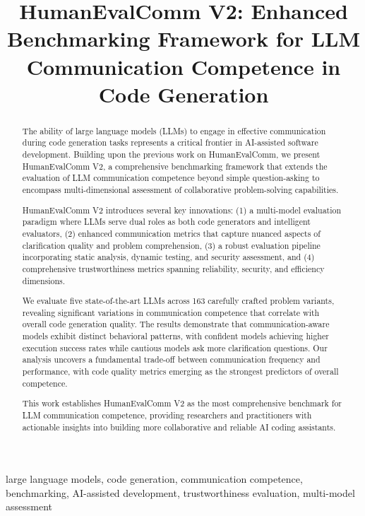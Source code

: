 \documentclass[conference]{IEEEtran}
\title{HumanEvalComm V2: Enhanced Benchmarking Framework for LLM Communication Competence in Code Generation}
\begin{document}
\maketitle

\begin{abstract}
The ability of large language models (LLMs) to engage in effective communication during code generation tasks represents a critical frontier in AI-assisted software development. Building upon the previous work on HumanEvalComm, we present HumanEvalComm V2, a comprehensive benchmarking framework that extends the evaluation of LLM communication competence beyond simple question-asking to encompass multi-dimensional assessment of collaborative problem-solving capabilities.

HumanEvalComm V2 introduces several key innovations: (1) a multi-model evaluation paradigm where LLMs serve dual roles as both code generators and intelligent evaluators, (2) enhanced communication metrics that capture nuanced aspects of clarification quality and problem comprehension, (3) a robust evaluation pipeline incorporating static analysis, dynamic testing, and security assessment, and (4) comprehensive trustworthiness metrics spanning reliability, security, and efficiency dimensions.

We evaluate five state-of-the-art LLMs across 163 carefully crafted problem variants, revealing significant variations in communication competence that correlate with overall code generation quality. The results demonstrate that communication-aware models exhibit distinct behavioral patterns, with confident models achieving higher execution success rates while cautious models ask more clarification questions. Our analysis uncovers a fundamental trade-off between communication frequency and performance, with code quality metrics emerging as the strongest predictors of overall competence.

This work establishes HumanEvalComm V2 as the most comprehensive benchmark for LLM communication competence, providing researchers and practitioners with actionable insights into building more collaborative and reliable AI coding assistants.
\end{abstract}

\begin{IEEEkeywords}
large language models, code generation, communication competence, benchmarking, AI-assisted development, trustworthiness evaluation, multi-model assessment
\end{IEEEkeywords}
\end{document}
